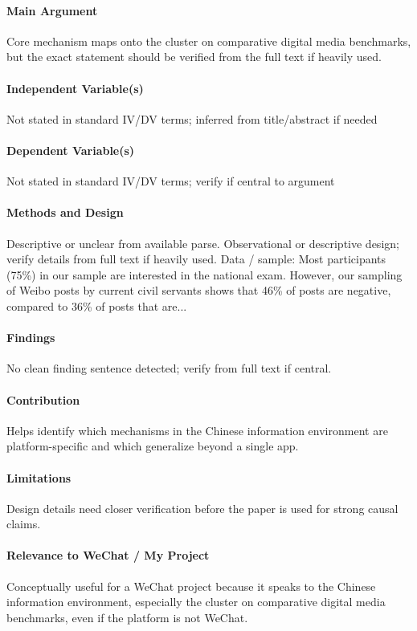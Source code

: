 \documentclass[12pt]{article}
\begin{document}
\paragraph{Main Argument} Core mechanism maps onto the cluster on comparative digital media benchmarks, but the exact statement should be verified from the full text if heavily used.

\paragraph{Independent Variable(s)} Not stated in standard IV/DV terms; inferred from title/abstract if needed

\paragraph{Dependent Variable(s)} Not stated in standard IV/DV terms; verify if central to argument

\paragraph{Methods and Design} Descriptive or unclear from available parse. Observational or descriptive design; verify details from full text if heavily used. Data / sample: Most participants (75\%) in our sample are interested in the national exam. However, our sampling of Weibo posts by current civil servants shows that 46\% of posts are negative, compared to 36\% of posts that are...

\paragraph{Findings} No clean finding sentence detected; verify from full text if central.

\paragraph{Contribution} Helps identify which mechanisms in the Chinese information environment are platform-specific and which generalize beyond a single app.

\paragraph{Limitations} Design details need closer verification before the paper is used for strong causal claims.

\paragraph{Relevance to WeChat / My Project} Conceptually useful for a WeChat project because it speaks to the Chinese information environment, especially the cluster on comparative digital media benchmarks, even if the platform is not WeChat.
\end{document}

